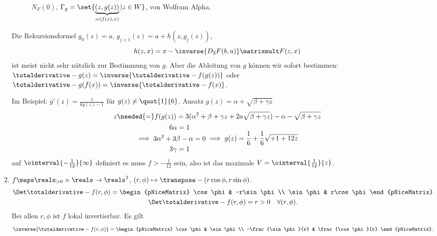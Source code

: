 \begin{beispiele}
\begin{enumerate}
\begin{figure}[H]
      \caption*{\( N_F(0) \), \textcolor{Blue}{\( \Gamma_g=\set{\underbrace{(z,g(z))}_{=(f(x),x)}|z\in W} \)}, von Wolfram Alpha.}
      \label{fig:satz_von_der_umkehrungsfunktion_beispiel_parabel_umkehrung}
    \end{figure}
    Die Rekursionsformel \( g_0(z)=a \), \( g_{j+1}(z)=a+h(z,g_j(z)) \),
    \begin{equation*}
      h(z,x)=x-\inverse{D_2 F(b,a)}\matrixmult F(z,x)
    \end{equation*}
    ist meist nicht sehr nützlich zur Bestimmung von \( g \). Aber die Ableitung von \( g \) können wir sofort bestimmen: \( \totalderivative-{g}(z)=\inverse{\totalderivative-{f}(g(z))} \) oder \( \totalderivative-{g}(f(x))=\inverse{\totalderivative-{f}(x)} \).

    Im Beispiel: \( g'(z)=\frac{1}{6g(z)-1} \) für \( g(z)\neq \quot{1}{6} \). \timplies Ansatz \( g(z)=\alpha+\sqrt{\beta+\gamma z} \)
    \begin{gather*}
      z\needed{=}f(g(z))=3(\alpha^2+\beta+\gamma z+2a\sqrt{\beta+\gamma z})-\alpha-\sqrt{\beta+\gamma z}\\
      \implies \begin{gathered}
        6\alpha = 1\\
        3\alpha^2+3\beta-\alpha=0\\
        3\gamma=1
    \end{gathered}\implies g(z)=\frac{1}{6}+\frac{1}{6}\sqrt{+1+12z}
    \end{gather*}
    auf \( \ointerval{-\frac{1}{12}}{\infty} \) definiert \timplies es muss \( f>-\frac{1}{12} \) sein, also ist das maximale \( V=\ointerval{\frac{1}{12}}{z} \).
    \item \( f\maps \reals_{>0}\times \reals\to \reals^2 \), \( (r,\phi)\mapsto \transpose-{(r\cos \phi, r\sin \phi)} \).
    \begin{gather*}
      \Det \totalderivative-{f}(r,\phi)=\begin{pNiceMatrix} \cos \phi & -r\sin \phi \\ \sin \phi
       & r\cos \phi \end{pNiceMatrix}\\
       \Det \totalderivative-{f}(r,\phi)=r>0\quad \forall (r,\phi).
    \end{gather*}
    \timplies Bei allen \( r,\phi \) ist \( f \) lokal invertierbar. Es gilt
    \begin{equation*}
      \inverse{\totalderivative-{f}(r,\phi)}=\begin{pNiceMatrix} \cos \phi & \sin \phi \\ -\frac{\sin \phi}{r} & \frac{\cos \phi}{r} \end{pNiceMatrix}.

\end{equation*}
\end{enumerate}
\end{beispiele}
